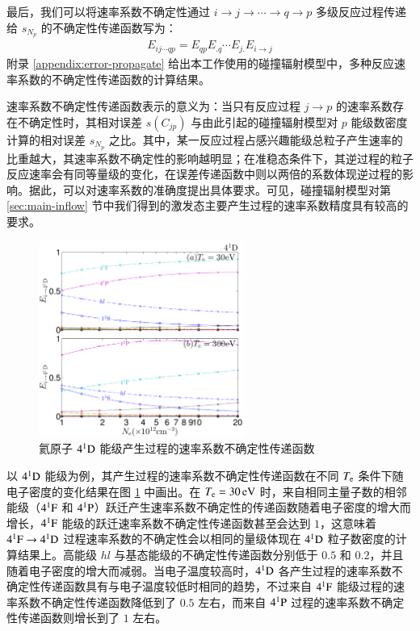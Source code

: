 最后，我们可以将速率系数不确定性通过 $i\to j\to\cdots\to q\to p$ 多级反应过程传递给 $s_{N_p}$ 的不确定性传递函数写为：
\begin{eqnarray}
E_{ij\cdots qp}=E_{qp}E_{.q}\cdots E_{j.}E_{i\to j}
\label{eq:appendix:error:MPDcoefficient}
\end{eqnarray}
附录 \ref{appendix:error-propagate} 给出本工作使用的碰撞辐射模型中，多种反应速率系数的不确定性传递函数的计算结果。

速率系数不确定性传递函数表示的意义为：当只有反应过程 $j\to p$ 的速率系数存在不确定性时，其相对误差 $s(C_{jp})$ 与由此引起的碰撞辐射模型对 $p$ 能级数密度计算的相对误差 $s_{N_p}$ 之比。其中，某一反应过程占感兴趣能级总粒子产生速率的比重越大，其速率系数不确定性的影响越明显；在准稳态条件下，其逆过程的粒子反应速率会有同等量级的变化，在误差传递函数中则以两倍的系数体现逆过程的影响。据此，可以对速率系数的准确度提出具体要求。可见，碰撞辐射模型对第 \ref{sec:main-inflow} 节中我们得到的激发态主要产生过程的速率系数精度具有较高的要求。

\begin{figure}%
  \centering
  \includegraphics[width=0.6\textwidth]{41D-error-propagation-coefficient.pdf}
  \caption{氦原子 $4^1{\rm D}$ 能级产生过程的速率系数不确定性传递函数}
  \label{fig:chap03:41D-error-propgation-function}
\end{figure}


以 $4^1{\rm D}$ 能级为例，其产生过程的速率系数不确定性传递函数在不同 $T_{\rm e}$ 条件下随电子密度的变化结果在图 \ref{fig:chap03:41D-error-propgation-function} 中画出。在 $T_{\rm e}=30\,{\rm eV}$ 时，来自相同主量子数的相邻能级（$4^1{\rm F}$ 和 $4^1{\rm P}$）跃迁产生速率系数不确定性的传递函数随着电子密度的增大而增长，$4^1{\rm F}$ 能级的跃迁速率系数不确定性传递函数甚至会达到 $1$，这意味着 $4^1{\rm F}\to 4^1{\rm D}$ 过程速率系数的不确定性会以相同的量级体现在 $4^1{\rm D}$ 粒子数密度的计算结果上。高能级 $hl$ 与基态能级的不确定性传递函数分别低于 $0.5$ 和 $0.2$，并且随着电子密度的增大而减弱。当电子温度较高时，$4^1{\rm D}$ 各产生过程的速率系数不确定性传递函数具有与电子温度较低时相同的趋势，不过来自 $4^1{\rm F}$ 能级过程的速率系数不确定性传递函数降低到了 $0.5$ 左右，而来自 $4^1{\rm P}$ 过程的速率系数不确定性传递函数则增长到了 $1$ 左右。


